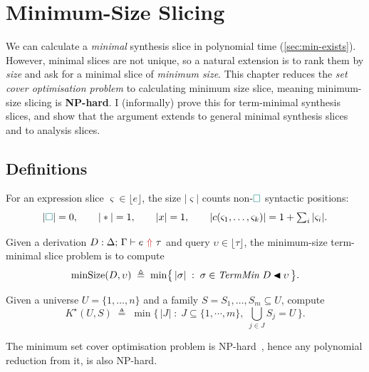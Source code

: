 \section{\no Minimum-Size Slicing}
\label{sec:complexity}

\sectionlegend

We can calculate a \textit{minimal} synthesis slice in polynomial time (\cref{sec:min-exists}). However, minimal slices are not unique, so a natural extension is to rank them by \textit{size} and ask for a minimal slice of \textit{minimum size}. This chapter reduces the \textit{set cover optimisation problem} to calculating minimum size slice, meaning minimum-size slicing is \textbf{NP-hard}. I (informally) prove this for term-minimal synthesis slices, and show that the argument extends to general minimal synthesis slices and to analysis slices.

\subsection{\no Definitions}\label{sec:complexity-setup}

\begin{definition}\label{def:slice-size}
For an expression slice $\varsigma \in \lfloor e \rfloor$, the size $|\varsigma|$ counts non-${\color{teal}\Box}$ syntactic positions:
\[
  |{\color{teal}\Box}| = 0,\qquad |*| = 1,\qquad |x| = 1, \qquad |c(\varsigma_1, \dots, \varsigma_k)| = 1 + \textstyle\sum_i |\varsigma_i|.
\]
\end{definition}

\begin{definition}\label{def:min-tm-slice}
Given a derivation $D : \synthesis{e}{\tau}$ and query $\upsilon \in \lfloor\tau\rfloor$, the minimum-size term-minimal slice problem is to compute
\[
  \mathrm{minSize}(D, \upsilon) \;\triangleq\; \min\bigl\{\,|\sigma| \;:\; \sigma \in \mathit{TermMin}\;D \mathbin{\blacktriangleleft} \upsilon\,\bigr\}.
\]
\end{definition}

\begin{definition}\label{def:min-set-cover}
Given a universe $U = \{1, \dots, n\}$ and a family $S = S_1, \dots, S_m \subseteq U$, compute
\[
  K^\star(U, S) \;\triangleq\; \min\bigl\{\,|J| \;:\; J \subseteq \{1, \cdots, m\},\; \textstyle\bigcup_{j \in J} S_j = U\,\bigr\}.
\]
\end{definition}

The minimum set cover optimisation problem is NP-hard~\cite[\S16.1, p.~414]{KorteVygen}, hence any polynomial reduction from it, is also NP-hard.

